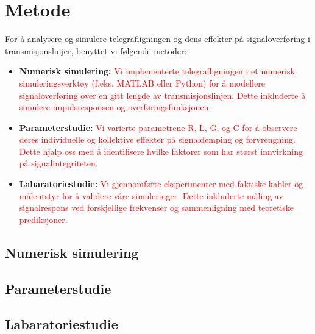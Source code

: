 \section{Metode}
    For å analysere og simulere telegrafligningen og dens effekter på signaloverføring i transmisjonslinjer, benyttet vi følgende metoder:
    
    \begin{itemize}
        
        \item \textbf{Numerisk simulering:} \textcolor{red}{Vi implementerte telegrafligningen i et numerisk simuleringsverktøy (f.eks. MATLAB eller Python) for å modellere signaloverføring over en gitt lengde av transmisjonslinjen. Dette inkluderte å simulere impulsresponsen og overføringsfunksjonen.}
        \item \textbf{Parameterstudie:} \textcolor{red}{Vi varierte parametrene R, L, G, og C for å observere deres individuelle og kollektive effekter på signaldemping og forvrengning. Dette hjalp oss med å identifisere hvilke faktorer som har størst innvirkning på signalintegriteten.}
        \item \textbf{Labaratoriestudie:}\textcolor{red}{ Vi gjennomførte eksperimenter med faktiske kabler og måleutstyr for å validere våre simuleringer. Dette inkluderte måling av signalrespons ved forskjellige frekvenser og sammenligning med teoretiske prediksjoner.}
    \end{itemize}
\subsection{Numerisk simulering}
    
\subsection{Parameterstudie}

\subsection{Labaratoriestudie}

